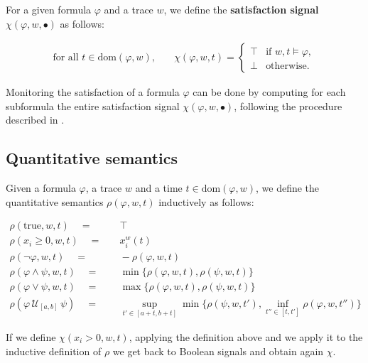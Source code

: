 \documentclass{suftesi}
\renewcommand{\b}{\textbf}
\newcommand{\dom}[1]{\mathrm{dom}(#1 ,w)}
\begin{document}
For a given formula $\varphi$ and a trace $w$, we define the \b{satisfaction signal} $\chi(\varphi,w,\bullet)$ as follows:

\begin{align*}
    \text{for all } t\in\dom{\varphi},  &\quad\chi(\varphi,w,t)=\begin{cases}
                                                                    \top    &\text{if } w,t\vDash\varphi,\\
                                                                    \bot    &\text{otherwise}.
                                                                 \end{cases}
\end{align*}

Monitoring the satisfaction of a formula $\varphi$ can be done by computing for each subformula the entire satisfaction signal $\chi(\varphi,w,\bullet)$, following the procedure described in \cite{maler2004}.

\subsection{Quantitative semantics}

Given a formula $\varphi$, a trace $w$ and a time $t\in\dom{\varphi}$, we define the quantitative semantics $\rho(\varphi, w, t)$ inductively as follows:

\begin{align*}
   \rho(\text{true},w,t) \quad                          =   &\quad \top\\
   \rho(x_i\geq 0,w,t) \quad                            =   &\quad x_i^w(t)\\
   \rho(\lnot \varphi,w,t) \quad                        =   &\quad -\rho(\varphi,w,t) \\
   \rho(\varphi \land \psi,w,t) \quad                   =   &\quad \min\{\rho(\varphi,w,t),\rho(\psi,w,t)\}\\
   \rho(\varphi \lor \psi,w,t) \quad                    =   &\quad \max\{\rho(\varphi,w,t),\rho(\psi,w,t)\}\\
   \rho(\varphi \, \mathcal{U}_{[a,b]} \, \psi) \quad   =   &\quad \sup_{t'\in[a+t,b+t]}\min\biggl\{\rho(\psi,w,t'), \inf_{t''\in[t,t']}\rho(\varphi,w,t'')\biggr\}
\end{align*}

If we define $\chi(x_i>0,w,t)$, applying the definition above and we apply it to the inductive definition of $\rho$ we get back to Boolean signals and obtain again $\chi$.
\end{document}
